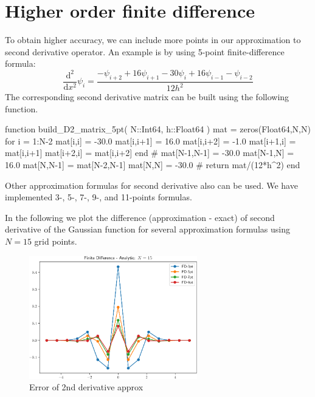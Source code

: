 \section{Higher order finite difference}

To obtain higher accuracy, we can include more points in our approximation to second
derivative operator. An example is by using 5-point finite-difference formula:
\begin{equation}
\frac{\mathrm{d}^2}{\mathrm{d}x^2} \psi_{i} =
\frac{-\psi_{i+2} + 16\psi_{i+1} - 30\psi_{i} + 16\psi_{i-1} - \psi_{i-2}}{12h^2}
\label{eq:fd_2nd_deriv_5pt}
\end{equation}
The corresponding second derivative matrix can be built using the following
function.
\begin{juliacode}
function build_D2_matrix_5pt( N::Int64, h::Float64 )
  mat = zeros(Float64,N,N)
  for i = 1:N-2
    mat[i,i] = -30.0
    mat[i,i+1] = 16.0
    mat[i,i+2] = -1.0
    mat[i+1,i] = mat[i,i+1]
    mat[i+2,i] = mat[i,i+2]
  end
  #
  mat[N-1,N-1] = -30.0
  mat[N-1,N] = 16.0
  mat[N,N-1] = mat[N-2,N-1]
  mat[N,N] = -30.0
  #
  return mat/(12*h^2)
end
\end{juliacode}

Other approximation formulas for second derivative also can be used. We have implemented 3-,
5-, 7-, 9-, and 11-points formulas.

In the following we plot the difference (approximation - exact) of second derivative of
the Gaussian function for several approximation formulas using $N=15$ grid points.
\begin{figure}[h]
{\center
\includegraphics[width=0.65\textwidth]{../codes/FD1d/IMG_compare_d2_gaussian_error_15.pdf}
\par}
\caption{Error of 2nd derivative approx}
\end{figure}

